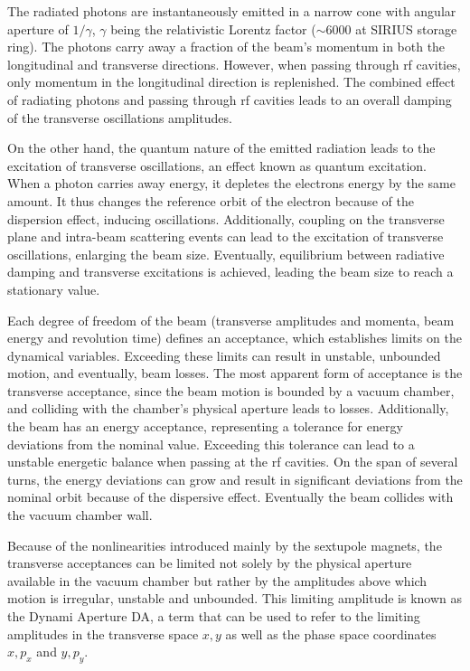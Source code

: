 The radiated photons are instantaneously emitted in a narrow cone with angular aperture of $1/\gamma$, $\gamma$ being the relativistic Lorentz factor ($\sim 6000$ at SIRIUS storage ring). The photons carry away a fraction of the beam's momentum in both the longitudinal and transverse directions. However, when passing through \gls*{rf} cavities, only momentum in the longitudinal direction is replenished. The combined effect of radiating photons and passing through \gls*{rf} cavities leads to an overall damping of the transverse oscillations amplitudes.

On the other hand, the quantum nature of the emitted radiation leads to the excitation of transverse oscillations, an effect known as quantum excitation. When a photon carries away energy, it depletes the electrons energy by the same amount. It thus changes the reference orbit of the electron because of the dispersion effect, inducing oscillations. Additionally, coupling on the transverse plane and intra-beam scattering events can lead to the excitation of transverse oscillations, enlarging the beam size.
Eventually, equilibrium between radiative damping and transverse excitations is achieved, leading the beam size to reach a stationary value.

Each degree of freedom of the beam (transverse amplitudes and momenta, beam energy and revolution time) defines an acceptance, which establishes limits on the dynamical variables. Exceeding these limits can result in unstable, unbounded motion, and eventually, beam losses. The most apparent form of acceptance is the transverse acceptance, since the beam motion is bounded by a vacuum chamber, and colliding with the chamber's physical aperture leads to losses. Additionally, the beam has an energy acceptance, representing a tolerance for energy deviations from the nominal value. Exceeding this tolerance can lead to a unstable energetic balance when passing at the \gls*{rf} cavities. On the span of several turns, the energy deviations can grow and result in significant deviations from the nominal orbit because of the dispersive effect. Eventually the beam collides with the vacuum chamber wall.

Because of the nonlinearities introduced mainly by the sextupole magnets, the transverse acceptances can be limited not solely by the physical aperture available in the vacuum chamber but rather by the amplitudes above which motion is irregular, unstable and unbounded. This limiting amplitude is known as the Dynami Aperture \gls*{DA}, a term that can be used to refer to the limiting amplitudes in the transverse space $x,y$ as well as the phase space coordinates $x, p_x$ and $y, p_y$.


